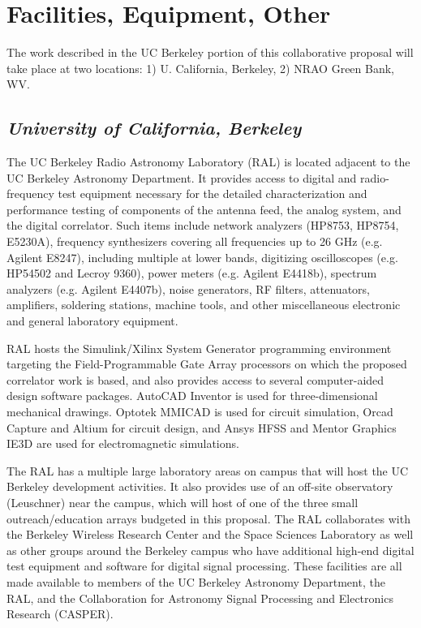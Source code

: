 \documentclass[11pt]{article}
\begin{document}
\pagestyle{empty}

\section*{Facilities, Equipment, Other}

The work described in the UC Berkeley portion of this collaborative proposal will take place at two locations: 
1) U. California, Berkeley, 
2) NRAO Green Bank, WV.

\subsection*{\it University of California, Berkeley}

The UC Berkeley Radio Astronomy Laboratory (RAL) is located adjacent to the UC
Berkeley Astronomy Department. It provides access to digital and
radio-frequency test equipment necessary for the detailed characterization and
performance testing of components of the antenna feed, the analog system, and
the digital correlator.  Such items include network analyzers (HP8753, HP8754,
E5230A), frequency synthesizers covering all frequencies up to 26 GHz (e.g.
Agilent E8247), including multiple at lower bands, digitizing oscilloscopes
(e.g. HP54502 and Lecroy 9360), power meters (e.g. Agilent E4418b), spectrum
analyzers (e.g. Agilent E4407b), noise generators, RF filters, attenuators,
amplifiers, soldering stations, machine tools, and other miscellaneous
electronic and general laboratory equipment.  

RAL hosts the Simulink/Xilinx System Generator programming
environment targeting the Field-Programmable Gate Array processors on which the
proposed correlator work is based, and
also provides access to several computer-aided design software packages. 
AutoCAD Inventor is used for three-dimensional mechanical drawings. 
Optotek MMICAD is used for circuit simulation, Orcad Capture and Altium for circuit design, and
Ansys HFSS and Mentor Graphics IE3D are used for electromagnetic simulations. 

The RAL has a multiple large laboratory areas on campus that will host the UC
Berkeley development activities.  It also provides use of an off-site
observatory (Leuschner) near the campus, which will host of one of the three
small outreach/education arrays budgeted in this proposal.  The RAL collaborates with
the Berkeley Wireless Research Center and the Space Sciences Laboratory as well
as other groups around the Berkeley campus who have additional high-end digital
test equipment and software for digital signal processing.  These facilities are
all made available to members of the UC Berkeley Astronomy Department, the RAL,
and the Collaboration for Astronomy Signal Processing and Electronics Research
(CASPER).
\end{document}
